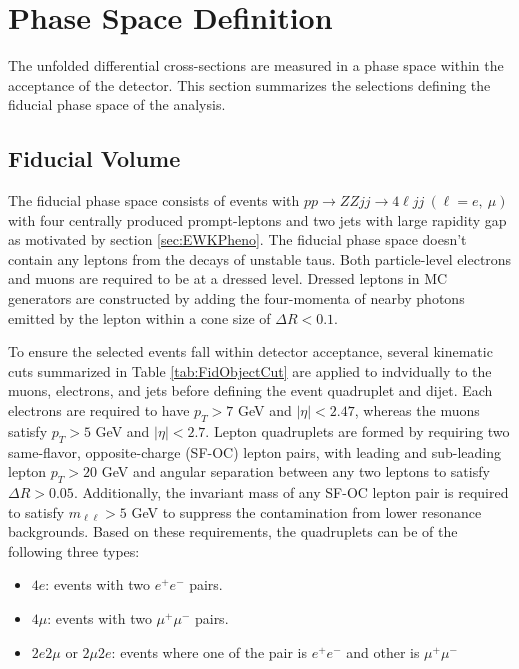 \section{Phase Space Definition}
\label{sec:FidSel}

The unfolded differential cross-sections are measured in a phase space within the acceptance of the detector. This section summarizes the selections defining the fiducial phase space of the analysis.

\subsection{Fiducial Volume}
\label{subsec:FidVol} 

The fiducial phase space consists of events with $pp\rightarrow ZZjj \rightarrow 4\ell jj ~(\ell = e,~\mu)$ with four centrally produced prompt-leptons and two jets with large rapidity gap as motivated by section \ref{sec:EWKPheno}. The fiducial phase space doesn't contain any leptons from the decays of unstable taus. Both particle-level electrons and muons are required to be at a dressed level. Dressed leptons in MC generators are constructed by adding the four-momenta of nearby photons emitted by the lepton within a cone size of $\Delta R < 0.1$. 

To ensure the selected events fall within detector acceptance, several kinematic cuts summarized in Table \ref{tab:FidObjectCut} are applied to indvidually to the muons, electrons, and jets before defining the event quadruplet and dijet. Each electrons are required to have $p_{T} > 7$ GeV and $|\eta| < 2.47$, whereas the muons satisfy $p_{T} > 5$ GeV and $|\eta| < 2.7$. Lepton quadruplets are formed by requiring two same-flavor, opposite-charge (SF-OC) lepton pairs, with leading and sub-leading lepton $p_{T}>20$ GeV and angular separation between any two leptons to satisfy $\Delta R > 0.05$. Additionally, the invariant mass of any SF-OC lepton pair is required to satisfy $m_{\ell \ell } > 5$ GeV to suppress the contamination from lower resonance backgrounds. Based on these requirements, the quadruplets can be of the following three types:

\begin{itemize}
\item{$4e$: events with two $e^{+}e^{-}$ pairs.}
\item{$4\mu$: events with two $\mu^{+}\mu^{-}$ pairs.}
\item{$2e2\mu$ or $2\mu2e$: events where one of the pair is $e^{+}e^{-}$ and other is $\mu^{+}\mu^{-}$}
\end{itemize}

